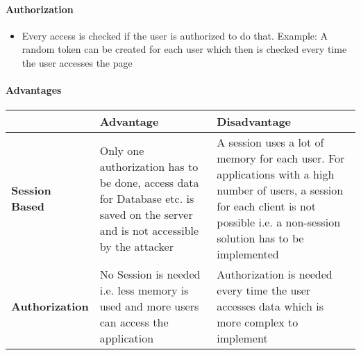 \documentclass[11pt,twoside,a4paper]{article}
\begin{document}
        \paragraph{Authorization}
        \begin{itemize}
        	\item Every access is checked if the user is authorized to do that. Example: A random token can be created for each user which then is checked every time the user accesses the page
        \end{itemize}

		\paragraph{Advantages}
		
		\begin{tabular}{|l|p{4cm}|p{4cm}|}
			\hline
			& \textbf{Advantage} & \textbf{Disadvantage} \\\hline
			\textbf{Session Based} & Only one authorization has to be done, access data for Database etc. is saved on the server and is not accessible by the attacker & A session uses a lot of memory for each user. For applications with a high number of users, a session for each client is not possible i.e. a non-session solution has to be implemented \\\hline
			\textbf{Authorization} & No Session is needed i.e. less memory is used and more users can access the application & Authorization is needed every time the user accesses data which is more complex to implement\\\hline
		\end{tabular}
		
\end{document}
